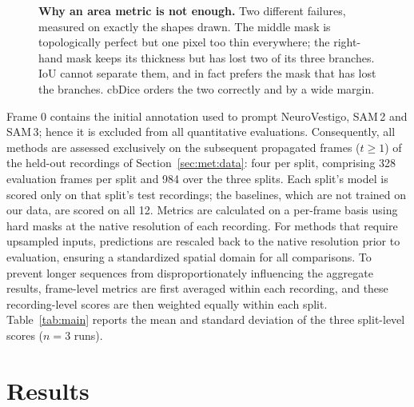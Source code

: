\documentclass[11pt,a4paper]{article}
\makeatletter
\let\SD@subsection\subsection
\renewcommand\subsection{\FloatBarrier\@ifstar{\SD@subsection*}{\SD@subsection}}
\makeatother
\begin{document}
\begin{figure}[!htb]
\caption{\textbf{Why an area metric is not enough.} Two different failures,
measured on exactly the shapes drawn. The middle mask is topologically
perfect but one pixel too thin everywhere; the right-hand mask keeps its
thickness but has lost two of its three branches. IoU cannot separate them,
and in fact prefers the mask that has lost the branches.
cbDice orders the two correctly and by a wide margin.}
\label{fig:whytopology}
\end{figure}

Frame 0 contains the initial annotation used to prompt NeuroVestigo, SAM\,2 and SAM\,3; hence it is excluded from all quantitative evaluations. Consequently, all methods are assessed exclusively on the subsequent propagated frames ($t \ge 1$) of the held-out recordings of Section~\ref{sec:met:data}: four per split, comprising 328 evaluation frames per split and 984 over the three splits. Each split's model is scored only on that split's test recordings; the baselines, which are not trained on our data, are scored on all 12. Metrics are calculated on a per-frame basis using hard masks at the native resolution of each recording. For methods that require upsampled inputs, predictions are rescaled back to the native resolution prior to evaluation, ensuring a standardized spatial domain for all comparisons. To prevent longer sequences from disproportionately influencing the aggregate results, frame-level metrics are first averaged within each recording, and these recording-level scores are then weighted equally within each split. Table~\ref{tab:main} reports the mean and standard deviation of the three split-level scores ($n = 3$ runs).

\section{Results}
\label{sec:results}

\subsection{Comparison with existing methods}
\label{sec:res:benchmark}
\end{document}
